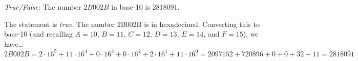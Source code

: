 \documentclass[11pt,letterpaper]{article}
\begin{document}
\quizsol \textit{True/False}: The number $2B002B$ in base-10 is 2818091. \pspace 

\sol The statement is \textit{true}. The number 2B002B is in hexadecimal. Converting this to base-10 (and recalling $A= 10$, $B= 11$, $C= 12$, $D= 13$, $E= 14$, and $F= 15$), we have\dots
	\[
	2B002B= 2 \cdot 16^5 + 11 \cdot 16^4 + 0 \cdot 16^3 + 0 \cdot 16^2 + 2 \cdot 16^1 + 11 \cdot 16^0= 2097152 + 720896 + 0 + 0 + 32 + 11= 2818091
	\]



\end{document}

